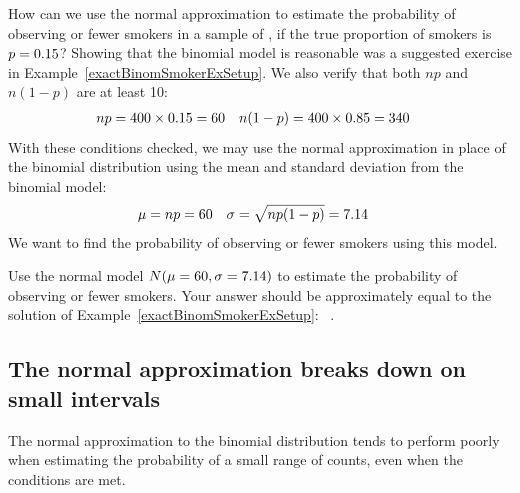 \begin{examplewrap}
\begin{nexample}{How can we use the normal approximation
    to estimate the probability of observing \smokex{} or
    fewer smokers in a sample of \smoken{}, if the true
    proportion of smokers is $p = 0.15{}$?}
  \label{approxNormalForSmokerBinomEx}
  Showing that the binomial model is reasonable was a
  suggested exercise in Example~\ref{exactBinomSmokerExSetup}.
  We also verify that both $np$ and $n(1-p)$ are at least 10:
  \begin{align*}
  np &= 400{} \times 0.15{} = 60{}
  &n (1 - p) &= 400{} \times 0.85{}
      = 340{}
  \end{align*}
  With these conditions checked, we may use the normal
  approximation in place of the binomial distribution
  using the mean and standard deviation from the binomial
  model:
  \begin{align*}
  \mu &= np = 60{}
  &\sigma &= \sqrt{np(1 - p)} = 7.14{}
  \end{align*}
  We want to find the probability of observing
  \smokex{} or fewer smokers using this model.
\end{nexample}
\end{examplewrap}

\begin{exercisewrap}
\begin{nexercise}
Use the normal model $N(\mu = 60{}, \sigma = 7.14{})$
to estimate the probability of observing \smokex{} or fewer
smokers.
Your answer should be approximately equal to the solution
of Example~\ref{exactBinomSmokerExSetup}:%
~\smokelowertailbinom{}.~\footnotemark{}
\end{nexercise}
\end{exercisewrap}



\newpage


\subsection{The normal approximation breaks down on small intervals}

The normal approximation to the binomial distribution tends to perform poorly when estimating the probability of a small range of counts, even when the conditions are met.

